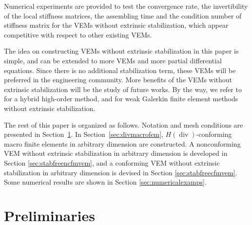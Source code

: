 \documentclass[10pt]{amsart}
\renewcommand{\div}{\operatorname{div}}
\numberwithin{equation}{section}
\begin{document}
Numerical experiments are provided to test the convergence rate, the invertibility of the local stiffness matrices, the assembling time and the condition number of stiffness
matrix for the VEMs without extrinsic stabilization, which appear competitive with respect to other existing VEMs.

The idea on constructing VEMs without extrinsic stabilization in this paper is simple,
and can be extended to more VEMs and more partial differential equations.
Since there is no additional stabilization term, these VEMs will be preferred in the engineering community. More benefits of the VEMs without extrinsic stabilization will be the study of future works.
By the way, we refer to \cite{CicuttinErnLemaire2019} for a hybrid high-order method, and 
\cite{YeZhang2020,AlTaweelWang2020,AlTaweelWang2020a,YeZhang2021,YeZhang2021a,AlTaweelWangYeZhang2021} for weak Galerkin finite element methods without extrinsic stabilization.



The rest of this paper is organized as follows. Notation and mesh conditions are presented in Section~\ref{sec:prelim}. 
In Section~\ref{sec:divmacrofem}, $H(\div)$-conforming macro finite elements in arbitrary dimension are constructed. A nonconforming VEM without extrinsic stabilization in arbitrary dimension is developed in Section \ref{sec:stabfreencfmvem}, and a conforming VEM without extrinsic stabilization in arbitrary dimension is devised in Section \ref{sec:stabfreecfmvem}.
Some numerical results are shown in Section \ref{sec:numericalexamps}.


\section{Preliminaries}\label{sec:prelim}
\end{document}
